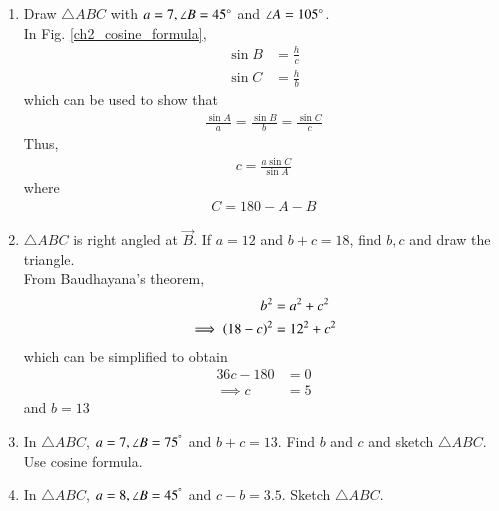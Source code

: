 \documentclass[journal,12pt,twocolumn]{IEEEtran}
\renewcommand\thesection{\arabic{section}}
\begin{document}
\begin{enumerate}[label=\thesection.\arabic*
,ref=\thesection.\theenumi]
\item Draw $\triangle ABC$ with $a = 7, \angle B = 45\degree$ and $\angle A = 105 \degree$. 
\\
\solution In Fig. \eqref{ch2_cosine_formula},	
\begin{align}
\label{eq:sin_form_def}
\sin B &= \frac{h}{c}
\\
\sin C &= \frac{h}{b}
\end{align}
%
which can be used to show that
\begin{align}
\label{eq:sin_form}
\frac{\sin A}{a}=\frac{\sin B}{b}=\frac{\sin C}{c}
\end{align}
%
Thus, 
\begin{align}
c = \frac{a\sin C}{\sin A}
\end{align}
where
\begin{align}
C = 180-A-B
\end{align}
\item $\triangle ABC$ is right angled at $\vec{B}$.  If $a = 12$ and $b+c = 18$, find $b,c$ and draw the triangle.
\\
\solution From Baudhayana's theorem, 
\begin{align}
b^2 &= a^2 + c^2
\\
\implies \left(18-c\right)^2 &= 12^2 +c^2
\end{align}
which can be simplified to obtain
\begin{align}
 36c -180&= 0
\\
\implies c&=5
\end{align}
%
and $b = 13$
\item In $\triangle ABC$,  $a = 7, \angle B = 75^{\degree}$ and $b+c = 13$. 
Find $b$ and $c$ and sketch $\triangle ABC$.
\\
\solution Use cosine formula.
\item In $\triangle ABC$,  $a = 8, \angle B = 45^{\degree}$ and $c-b = 3.5$.
Sketch $\triangle ABC$.


\end{enumerate}
\end{document}
